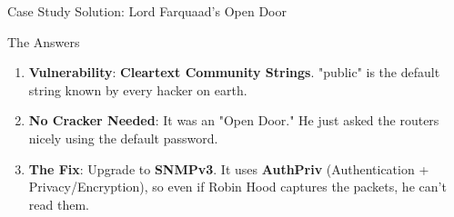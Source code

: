 \documentclass[aspectratio=169]{beamer}  %
\begin{document}
\begin{frame}{Case Study Solution: Lord Farquaad's Open Door}
    \begin{exampleblock}{The Answers}
        \footnotesize
        \begin{enumerate}
            \item \textbf{Vulnerability}: \textbf{Cleartext Community Strings}. "public" is the default string known by every hacker on earth.
            \item \textbf{No Cracker Needed}: It was an "Open Door." He just asked the routers nicely using the default password.
            \item \textbf{The Fix}: Upgrade to \textbf{SNMPv3}. It uses \textbf{AuthPriv} (Authentication + Privacy/Encryption), so even if Robin Hood captures the packets, he can't read them.
        \end{enumerate}
    \end{exampleblock}
    \begin{center}
    \end{center}
\end{frame}

\end{document}
